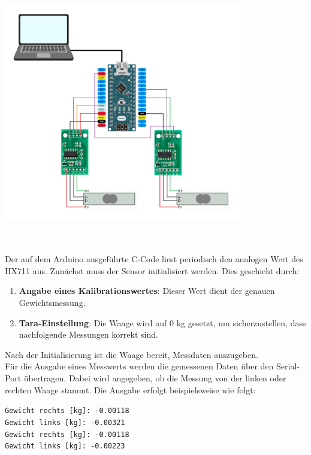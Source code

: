\begin{center}
    \centering
    \includegraphics[width=0.8\textwidth]{img/Schaltungs-Aufbau.png}
     \label{Gesamtaufbau Wägezelle mit Arduino Nano}
\end{center}
\\
\\
Der auf dem Arduino ausgeführte C-Code liest periodisch den analogen Wert des HX711 aus. Zunächst muss der Sensor initialisiert werden. Dies geschieht durch:
\begin{enumerate}
    \item \textbf{Angabe eines Kalibrationswertes}: Dieser Wert dient der genauen Gewichtsmessung.
    \item \textbf{Tara-Einstellung}: Die Waage wird auf 0 kg gesetzt, um sicherzustellen, dass nachfolgende Messungen korrekt sind.
\end{enumerate}
Nach der Initialisierung ist die Waage bereit, Messdaten auszugeben.
\\
Für die Ausgabe eines Messwerts werden die gemessenen Daten über den Serial-Port übertragen.
Dabei wird angegeben, ob die Messung von der linken oder rechten Waage stammt.
Die Ausgabe erfolgt beispielsweise wie folgt:
\begin{center}
    \texttt{Gewicht rechts [kg]: -0.00118}  \\
    \texttt{Gewicht links [kg]: -0.00321} \\
    \texttt{Gewicht rechts [kg]: -0.00118} \\
    \texttt{Gewicht links [kg]: -0.00223} \\
\end{center}
